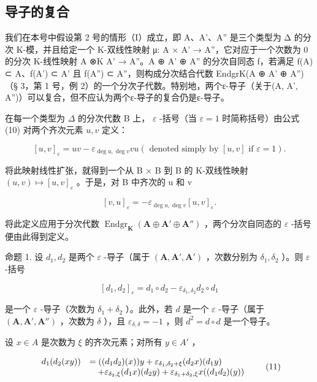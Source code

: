\subsection{导子的复合}

我们在本号中假设第 2 号的情形（I）成立，即 A、A'、A'' 是三个类型为 Δ 的分次 K-模，并且给定一个 K-双线性映射 μ: A × A' → A''，它对应于一个次数为 0 的分次 K-线性映射 A ⊗K A' → A''。A ⊕ A' ⊕ A'' 的分次自同态 f，若满足 f(A) ⊂ A、f(A') ⊂ A' 且 f(A'') ⊂ A''，则构成分次结合代数 EndgrK(A ⊕ A' ⊕ A'')（§ 3，第 1 号，例 2）的一个分次子代数。特别地，两个ε-导子（关于(A, A', A'')）可以复合，但不应认为两个ε-导子的复合仍是ε-导子。

在每一个类型为 \(\Delta\) 的分次代数 B 上， \(\varepsilon\) -括号（当 \(\varepsilon = 1\) 时简称括号）由公式 (10) 对两个齐次元素 \(u, v\) 定义：

\[
[ u, v ] _ {\varepsilon} = u v - \varepsilon_ {\deg u, \deg v} v u (\text { denoted   simply   by } [ u, v ] \text { if } \varepsilon = 1).
\]

将此映射线性扩张，就得到一个从 B × B 到 B 的 K-双线性映射 \((u, v) \mapsto [u, v]_{\varepsilon}\) 。于是，对 B 中齐次的 u 和 v

\[
[ v, u ] _ {\varepsilon} = - \varepsilon_ {\deg u, \deg v} [ u, v ] _ {\varepsilon}.
\]

将此定义应用于分次代数 \(\operatorname{Endgr}_{\mathbf{K}}(\mathbf{A} \oplus \mathbf{A}' \oplus \mathbf{A}'')\) ，两个分次自同态的 \(\varepsilon\) -括号便由此得到定义。

命题 1. 设 \(d_1, d_2\) 是两个 \(\varepsilon\) -导子（属于 \((\mathbf{A}, \mathbf{A}', \mathbf{A} ' )\) ，次数分别为 \(\delta_1, \delta_2\) ）。则 \(\varepsilon\) -括号

\[
[ d _ {1}, d _ {2} ] _ {\varepsilon} = d _ {1} \circ d _ {2} - \varepsilon_ {\delta_ {1}, \delta_ {2}} d _ {2} \circ d _ {1}
\]

是一个 \(\varepsilon\) -导子（次数为 \(\delta_1 + \delta_2\) ）。此外，若 \(d\) 是一个 \(\varepsilon\) -导子（属于 \((\mathbf{A}, \mathbf{A}', \mathbf{A}'')\) ，次数为 \(\delta\) ），且 \(\varepsilon_{\delta, \delta} = -1\) ，则 \(d^2 = d \circ d\) 是一个导子。

设 \(x \in A\) 是次数为 \(\xi\) 的齐次元素；对所有 \(y \in A'\) ，

\[
\begin{array}{r l} d _ {1} (d _ {2} (x y)) & = ((d _ {1} d _ {2}) (x)) y + \varepsilon_ {\delta_ {1}, \delta_ {2} + \xi} (d _ {2} x) (d _ {1} y) \\ & \quad + \varepsilon_ {\delta_ {2}, \xi} (d _ {1} x) (d _ {2} y) + \varepsilon_ {\delta_ {1} + \delta_ {2}, \xi} x ((d _ {1} d _ {2}) (y)) \end{array}\tag{11}
\]

